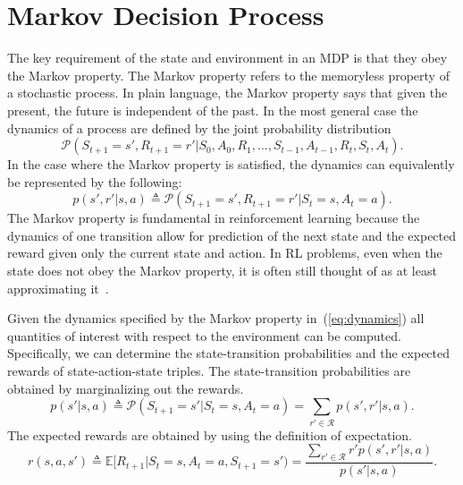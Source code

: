 \documentclass{article}
\newcommand{\mc}{\mathcal}
\newcommand{\mb}{\mathbb}
\begin{document}
\section{Markov Decision Process}\label{sec:mdp}
The key requirement of the state and environment in an MDP is that they obey the Markov property. The Markov property refers to the memoryless property of a stochastic process. In plain language, the Markov property says that given the present, the future is independent of the past. In the most general case the dynamics of a process are defined by the joint probability distribution
\begin{equation}
\mc{P}(S_{t+1}=s', R_{t+1}=r'|S_0, A_0, R_1, \dots, S_{t-1}, A_{t-1}, R_t, S_t, A_t).
\end{equation}
In the case where the Markov property is satisfied, the dynamics can equivalently be represented by the following:
\begin{equation}\label{eq:dynamics}
p(s', r'|s, a) \triangleq \mc{P}(S_{t+1}=s', R_{t+1}=r'|S_t=s, A_t=a).
\end{equation}
The Markov property is fundamental in reinforcement learning because the dynamics of one transition allow for prediction of the next state and the expected reward given only the current state and action. In RL problems, even when the state does not obey the Markov property, it is often still thought of as at least approximating it~\cite{sutton1998reinforcement}.

Given the dynamics specified by the Markov property in~(\ref{eq:dynamics}) all quantities of interest with respect to the environment can be computed. Specifically, we can determine the state-transition probabilities and the expected rewards of state-action-state triples. The state-transition probabilities are obtained by marginalizing out the rewards.
\begin{equation}
p(s'|s, a) \triangleq \mc{P}(S_{t+1}=s'|S_t=s, A_t=a) = \sum_{r' \in \mc{R}} p(s', r'|s, a).
\end{equation}
The expected rewards are obtained by using the definition of expectation.
\begin{equation}
r(s,a,s') \triangleq \mb{E}[R_{t+1}|S_t=s, A_t=a, S_{t+1}=s') = \frac{\sum_{r' \in \mc{R}} r'p(s', r'|s, a)}{p(s'|s,a)}.
\end{equation}
\end{document}
